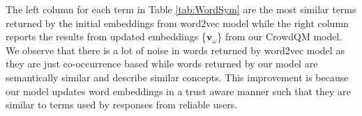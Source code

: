The left column for each term in Table \ref{tab:WordSym} are the most similar terms returned by the initial embeddings from word2vec model while the right column reports the results from updated embeddings \{$\bm{v}_\omega$\} from our CrowdQM model.
We observe that there is a lot of noise in words returned by word2vec model as they are just co-occurrence based while words returned by our model are semantically similar and describe similar concepts. This improvement is because our model updates word embeddings in a trust aware manner such that they are similar to terms used by responses from reliable users.
